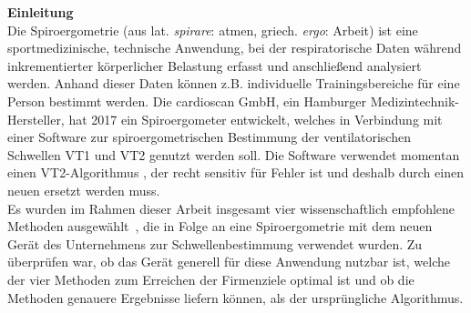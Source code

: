 \textbf{\Large Einleitung}\\

Die Spiroergometrie (aus lat. \textsl{spirare}: atmen, griech. \textsl{ergo}: Arbeit) ist eine sportmedizinische, technische Anwendung, bei der respiratorische Daten während inkrementierter körperlicher Belastung erfasst und anschließend analysiert werden. Anhand dieser Daten können z.B. individuelle Trainingsbereiche für eine Person bestimmt werden. Die cardioscan GmbH, ein Hamburger Medizintechnik-Hersteller, hat 2017 ein Spiroergometer entwickelt, welches in Verbindung mit einer Software zur spiroergometrischen Bestimmung der ventilatorischen Schwellen VT1 und VT2 genutzt werden soll. Die Software verwendet momentan einen VT2-Algorithmus , der recht sensitiv für Fehler ist und deshalb durch einen neuen ersetzt werden muss.\\
Es wurden im Rahmen dieser Arbeit insgesamt vier wissenschaftlich empfohlene Methoden ausgewählt~\cite{Westhoff.2012}, die in Folge an eine Spiroergometrie mit dem neuen Gerät des Unternehmens zur Schwellenbestimmung verwendet wurden. Zu überprüfen war, ob das Gerät generell für diese Anwendung nutzbar ist, welche der vier Methoden zum Erreichen der Firmenziele optimal ist und ob die Methoden genauere Ergebnisse liefern können, als der ursprüngliche Algorithmus.\\





